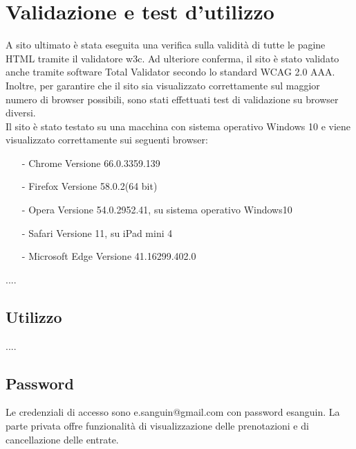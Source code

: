\section{Validazione e test d'utilizzo}
A sito ultimato è stata eseguita una verifica sulla validità di tutte le pagine HTML tramite il validatore w3c. Ad ulteriore conferma, il sito è stato validato anche tramite software Total Validator secondo lo standard WCAG 2.0 AAA.
Inoltre, per garantire che il sito sia visualizzato correttamente sul maggior numero di browser possibili, sono stati effettuati test di validazione su browser diversi.
\\
Il sito è stato testato su una macchina con sistema operativo Windows 10 e viene visualizzato correttamente sui seguenti browser:
\begin{itemize}
	\item [-] Chrome Versione 66.0.3359.139
	\item [-] Firefox Versione 58.0.2(64 bit)
	\item [-] Opera Versione 54.0.2952.41, su sistema operativo Windows10
	\item [-] Safari Versione 11, su iPad mini 4
	\item [-] Microsoft Edge Versione 41.16299.402.0
\end{itemize}
....
\subsection{Utilizzo}
....
\subsection{Password}
Le credenziali di accesso sono  e.sanguin@gmail.com  con password esanguin. La parte privata offre funzionalità di visualizzazione delle prenotazioni e di cancellazione delle entrate. 
